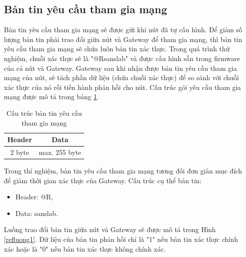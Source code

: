 \subsection{Bản tin yêu cầu tham gia mạng}
Bản tin yêu cầu tham gia mạng sẽ được gửi khi nút đã tự cấu hình. Để giảm số lượng bản tin phải trao đổi giữa nút và Gateway để tham gia mạng, thì bản tin yêu cầu tham gia mạng sẽ chứa luôn bản tin xác thực. Trong quá trình thử nghiệm, chuỗi xác thực sẽ là "@Rsanslab" và được cấu hình sẵn trong firmware của cả nút và Gateway. Gateway sau khi nhận được bản tin yêu cầu tham gia mạng của nút, sẽ tách phần dữ liệu (chứa chuỗi xác thực) để so sánh với chuỗi xác thực của nó rồi tiến hành phản hồi cho nút. Cấu trúc gói yêu cầu tham gia mạng được mô tả trong bảng \ref{construction_rq}{}.
\begin{table}[h]
 \centering
    \caption{Cấu trúc bản tin yêu cầu tham gia mạng}
    \begin{tabular}{|c|c|}
    	\hline
     	Header & Data \\
     	\hline
     	2 byte & max. 255 byte\\
     	\hline
    \end{tabular}
    \label{construction_rq}
\end{table}
Trong thí nghiệm, bản tin yêu cầu tham gia mạng tương đối đơn giản mục đích để giảm thời gian xác thực của Gateway. Cấu trúc cụ thể bản tin:
\begin{itemize}
\item	Header: @R,
\item	Data: sanslab.
\end{itemize}
\par 
Luồng trao đổi bản tin giữa nút và Gateway sẽ được mô tả trong Hình \ref{refluong1}{}. Dữ liệu của bản tin phản hồi chỉ là "1" nếu bản tin xác thực chính xác hoặc là "0" nếu bản tin xác thực không chính xác.\\
